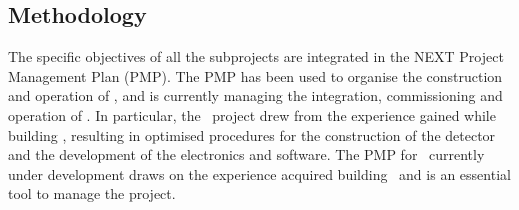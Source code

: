 \subsection{Methodology}

The specific objectives of all the subprojects are integrated in the NEXT Project Management Plan (PMP). The PMP has been used to organise the construction and operation of \NEW, and is currently managing the integration, commissioning and operation of \Next. 
In particular, the \Next\  project drew from the experience gained while building \NEW, resulting in optimised procedures for the construction of the detector and the development of the electronics and software. The PMP for \NHD\ currently under development draws on the experience acquired building \Next\ and is an essential tool to manage the project.  



